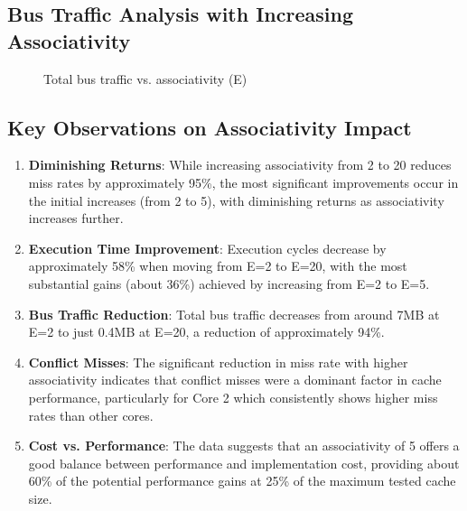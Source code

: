 \documentclass[12pt,a4paper]{article}
\begin{document}
\subsection{Bus Traffic Analysis with Increasing Associativity}

\begin{figure}[H]
\centering
{}
\caption{Total bus traffic vs. associativity (E)}
\label{fig:bus_traffic_vs_e}
\end{figure}

\subsection{Key Observations on Associativity Impact}

\begin{enumerate}
    \item \textbf{Diminishing Returns}: While increasing associativity from 2 to 20 reduces miss rates by approximately 95\%, the most significant improvements occur in the initial increases (from 2 to 5), with diminishing returns as associativity increases further.
    
    \item \textbf{Execution Time Improvement}: Execution cycles decrease by approximately 58\% when moving from E=2 to E=20, with the most substantial gains (about 36\%) achieved by increasing from E=2 to E=5.
    
    \item \textbf{Bus Traffic Reduction}: Total bus traffic decreases from around 7MB at E=2 to just 0.4MB at E=20, a reduction of approximately 94\%.
    
    \item \textbf{Conflict Misses}: The significant reduction in miss rate with higher associativity indicates that conflict misses were a dominant factor in cache performance, particularly for Core 2 which consistently shows higher miss rates than other cores.
    
    \item \textbf{Cost vs. Performance}: The data suggests that an associativity of 5 offers a good balance between performance and implementation cost, providing about 60\% of the potential performance gains at 25\% of the maximum tested cache size.
\end{enumerate}
\end{document}
